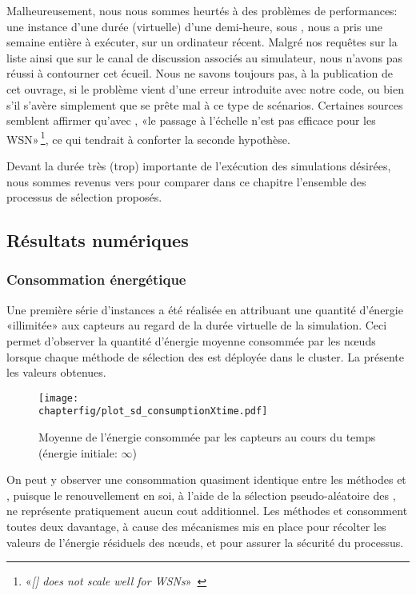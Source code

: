 Malheureusement, nous nous sommes heurtés à des problèmes de performances: une instance d'une durée (virtuelle) d'une demi-heure, sous \nsiii, nous a pris une semaine entière à exécuter, sur un ordinateur récent.
Malgré nos requêtes sur la liste ainsi que sur le canal de discussion associés au simulateur, nous n'avons pas réussi à contourner cet écueil.
Nous ne savons toujours pas, à la publication de cet ouvrage, si le problème vient d'une erreur introduite avec notre code, ou bien s'il s'avère simplement que \nsiii se prête mal à ce type de scénarios.
Certaines sources semblent affirmer qu'avec \nsiii, «le passage à l'échelle n'est pas efficace pour les WSN»\,\footnote{«\textit{[\nsiiinxs] does not scale well for WSNs}»~\cite{AAAHN12}}, ce qui tendrait à conforter la seconde hypothèse.

Devant la durée très (trop) importante de l'exécution des simulations désirées, nous sommes revenus vers \nsii pour comparer dans ce chapitre l'ensemble des processus de sélection proposés.

    \subsection{Résultats numériques}

        \subsubsection{Consommation énergétique}

Une première série d'instances a été réalisée en attribuant une quantité d'énergie «illimitée» aux capteurs au regard de la durée virtuelle de la simulation.
Ceci permet d'observer la quantité d'énergie moyenne consommée par les nœuds lorsque chaque méthode de sélection des \cns est déployée dans le cluster.
La  présente les valeurs obtenues.
\begin{figure}[!ht]
    \centering
    \texttt{[image: \\chapterfig/plot\_sd\_consumptionXtime.pdf]}
    \caption[Moyenne de l'énergie consommée par les capteurs au cours du temps]{Moyenne de l'énergie consommée par les capteurs au cours du temps (énergie initiale: $\infty$)}\label{sd:fig:cons-inf}
\end{figure}
On peut y observer une consommation quasiment identique entre les méthodes \idstat et \idrand, puisque le renouvellement en soi, à l'aide de la sélection pseudo-aléatoire des \cns, ne représente pratiquement aucun cout additionnel.
Les méthodes \ideres et \iddemx consomment toutes deux davantage, à cause des mécanismes mis en place pour récolter les valeurs de l'énergie résiduels des nœuds, et pour assurer la sécurité du processus.

